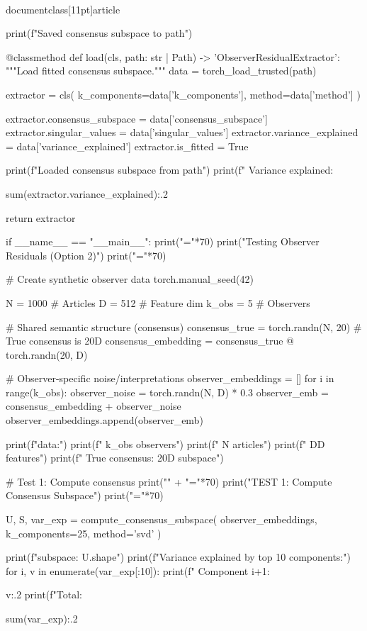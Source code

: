 \\documentclass[11pt]{article}
\begin{document}
\begin{CodeBlock}
{        print(f"Saved consensus subspace to {path}")
    
    @classmethod
    def load(cls, path: str | Path) -> 'ObserverResidualExtractor':
        """Load fitted consensus subspace."""
        data = torch_load_trusted(path)
        
        extractor = cls(
            k_components=data['k_components'],
            method=data['method']
        )
        
        extractor.consensus_subspace = data['consensus_subspace']
        extractor.singular_values = data['singular_values']
        extractor.variance_explained = data['variance_explained']
        extractor.is_fitted = True
        
        print(f"Loaded consensus subspace from {path}")
        print(f"  Variance explained: {sum(extractor.variance_explained):.2%
        
        return extractor


if __name__ == "__main__":
    print("="*70)
    print("Testing Observer Residuals (Option 2)")
    print("="*70)
    
    # Create synthetic observer data
    torch.manual_seed(42)
    
    N = 1000  # Articles
    D = 512   # Feature dim
    k_obs = 5  # Observers
    
    # Shared semantic structure (consensus)
    consensus_true = torch.randn(N, 20)  # True consensus is 20D
    consensus_embedding = consensus_true @ torch.randn(20, D)
    
    # Observer-specific noise/interpretations
    observer_embeddings = []
    for i in range(k_obs):
        observer_noise = torch.randn(N, D) * 0.3
        observer_emb = consensus_embedding + observer_noise
        observer_embeddings.append(observer_emb)
    
    print(f"\nSynthetic data:")
    print(f"  {k_obs} observers")
    print(f"  {N} articles")
    print(f"  {D}D features")
    print(f"  True consensus: 20D subspace")
    
    # Test 1: Compute consensus
    print("\n" + "="*70)
    print("TEST 1: Compute Consensus Subspace")
    print("="*70)
    
    U, S, var_exp = compute_consensus_subspace(
        observer_embeddings,
        k_components=25,
        method='svd'
    )
    
    print(f"\nConsensus subspace: {U.shape}")
    print(f"Variance explained by top 10 components:")
    for i, v in enumerate(var_exp[:10]):
        print(f"  Component {i+1}: {v:.2%
    print(f"Total: {sum(var_exp):.2%
    
}}}}
\end{CodeBlock}
\end{document}
